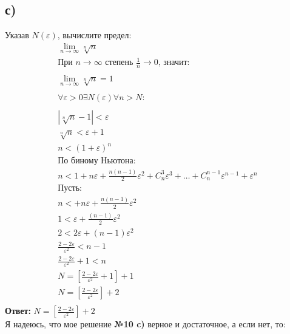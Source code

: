 \documentclass[a4paper,12pt]{article}
\begin{document}
\subsection*{с) }
Указав $ N(\varepsilon) $, вычислите предел:
\begin{equation*}
\begin{gathered}
\lim_{n\to\infty} \sqrt[n]{n}\\
\text{При } n \to \infty \text{ степень } \frac{1}{n} \to 0 \text{, значит:}\\\\
\lim_{n\to\infty} \sqrt[n]{n} = 1\\\\
\forall \varepsilon > 0  \exists N(\varepsilon) \forall n > N:\\\\
|\sqrt[n]{n} - 1| < \varepsilon\\
\sqrt[n]{n} < \varepsilon + 1\\
n < (1 + \varepsilon)^n\\
\text{По биному Ньютона: } \\
n < 1 + n\varepsilon + \frac{n(n-1)}{2} \varepsilon^2 + C_n^3\varepsilon^3 + \ldots + C_n^{n-1}\varepsilon^{n-1} + \varepsilon^n\\
\text{Пусть:}\\
n <  + n\varepsilon + \frac{n(n-1)}{2}\varepsilon^2\\
1 < \varepsilon + \frac{(n-1)}{2} \varepsilon^2\\
2 < 2\varepsilon + (n-1)\varepsilon^2\\
\frac{2-2\varepsilon}{\varepsilon^2} < n-1\\
\frac{2-2\varepsilon}{\varepsilon^2} + 1 < n\\
N = \left[ \frac{2-2\varepsilon}{\varepsilon^2} +1 \right] + 1\\
N = \left[ \frac{2-2\varepsilon}{\varepsilon^2} \right] + 2\\
\end{gathered}
\end{equation*}
{\Large \textbf{Ответ:} $N = \left[ \frac{2-2\varepsilon}{\varepsilon^2} \right] + 2\ $}\\
\newpage
Я надеюсь, что мое решение \textbf{№10 c)} верное и достаточное, а если нет, то:\\\\
\end{document}
